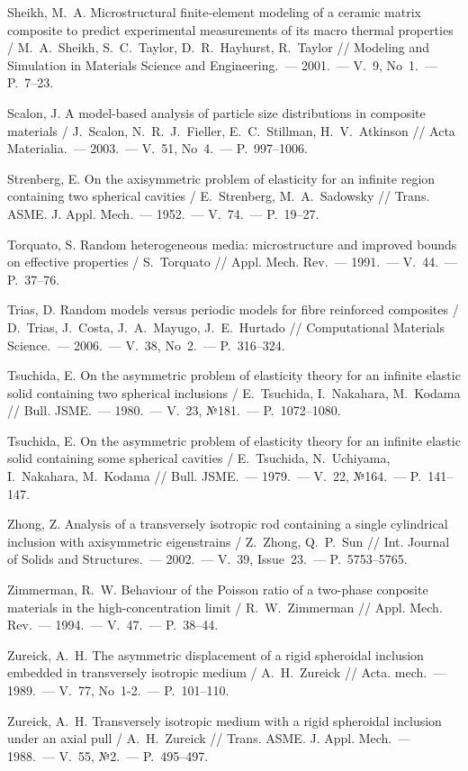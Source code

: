 \begin{biblist}{99}
Sheikh, M.~A. 
Microstructural finite-element modeling of a ceramic matrix composite to predict experimental measurements of its macro thermal properties 
/ M.~A.~Sheikh, S.~C.~Taylor, D.~R.~Hayhurst, R.~Taylor 
// Modeling and Simulation in Materials Science and Engineering.~--- 2001.~--- V.~9, No~1.~--- P.~7--23.

Scalon, J. 
A model-based analysis of particle size distributions in composite materials 
/ J.~Scalon, N.~R.~J.~Fieller, E.~C.~Stillman, H.~V.~Atkinson 
// Acta Materialia.~--- 2003.~--- V.~51, No~4.~--- P.~997--1006.

Strenberg, E. 
On the axisymmetric problem of elasticity for an infinite region containing two spherical cavities 
/ E.~Strenberg, M.~A.~Sadowsky 
// Trans. ASME. J. Appl. Mech.~--- 1952.~--- V.~74.~--- P.~19--27.

Torquato, S. 
Random heterogeneous media: microstructure and improved bounds on effective properties  
/ S.~Torquato 
// Appl. Mech. Rev.~--- 1991.~--- V.~44.~--- P.~37--76.

Trias, D. 
Random models versus periodic models for fibre reinforced composites 
/ D.~Trias, J.~Costa, J.~A.~Mayugo, J.~E.~Hurtado 
// Computational Materials Science.~--- 2006.~--- V.~38, No~2.~--- P.~316--324.

Tsuchida, E. On the asymmetric problem of elasticity theory for an infinite elastic solid containing two spherical inclusions 
/ E.~Tsuchida, I.~Nakahara, M.~Kodama 
// Bull. JSME.~--- 1980.~--- V.~23, №181.~--- P.~1072--1080.

Tsuchida, E. 
On the asymmetric problem of elasticity theory for an infinite elastic solid containing some spherical cavities 
/ E.~Tsuchida, N.~Uchiyama, I.~Nakahara, M.~Kodama 
// Bull. JSME.~--- 1979.~--- V.~22, №164.~--- P.~141--147.

Zhong, Z. 
Analysis of a transversely isotropic rod containing a single cylindrical inclusion with axisymmetric eigenstrains 
/ Z.~Zhong, Q.~P.~Sun 
// Int. Journal of Solids and Structures.~--- 2002.~--- V.~39, Issue~23.~--- P.~5753--5765.

Zimmerman, R.~W. 
Behaviour of the Poisson ratio of a two-phase conposite materials in the high-concentration limit  
/ R.~W.~Zimmerman 
// Appl. Mech. Rev.~--- 1994.~--- V.~47.~--- P.~38--44.

Zureick, A.~H. 
The asymmetric displacement of a rigid spheroidal inclusion embedded in transversely isotropic medium 
/ A.~H.~Zureick 
// Acta. mech.~--- 1989.~--- V.~77, No~1-2.~--- P.~101--110.

Zureick, A.~H. 
Transversely isotropic medium with a rigid spheroidal inclusion under an axial pull 
/ A.~H.~Zureick 
// Trans. ASME. J. Appl. Mech.~--- 1988.~--- V.~55, №2.~--- P.~495--497.

\end{biblist}